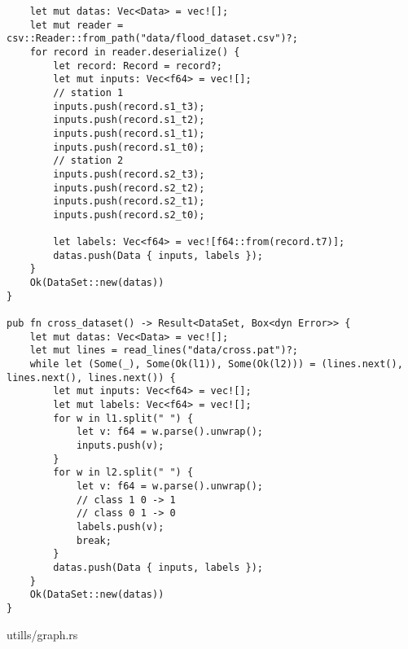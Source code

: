 \begin{verbatim}
    let mut datas: Vec<Data> = vec![];
    let mut reader = csv::Reader::from_path("data/flood_dataset.csv")?;
    for record in reader.deserialize() {
        let record: Record = record?;
        let mut inputs: Vec<f64> = vec![];
        // station 1
        inputs.push(record.s1_t3);
        inputs.push(record.s1_t2);
        inputs.push(record.s1_t1);
        inputs.push(record.s1_t0);
        // station 2
        inputs.push(record.s2_t3);
        inputs.push(record.s2_t2);
        inputs.push(record.s2_t1);
        inputs.push(record.s2_t0);

        let labels: Vec<f64> = vec![f64::from(record.t7)];
        datas.push(Data { inputs, labels });
    }
    Ok(DataSet::new(datas))
}

pub fn cross_dataset() -> Result<DataSet, Box<dyn Error>> {
    let mut datas: Vec<Data> = vec![];
    let mut lines = read_lines("data/cross.pat")?;
    while let (Some(_), Some(Ok(l1)), Some(Ok(l2))) = (lines.next(), lines.next(), lines.next()) {
        let mut inputs: Vec<f64> = vec![];
        let mut labels: Vec<f64> = vec![];
        for w in l1.split(" ") {
            let v: f64 = w.parse().unwrap();
            inputs.push(v);
        }
        for w in l2.split(" ") {
            let v: f64 = w.parse().unwrap();
            // class 1 0 -> 1
            // class 0 1 -> 0
            labels.push(v);
            break;
        }
        datas.push(Data { inputs, labels });
    }
    Ok(DataSet::new(datas))
}
\end{verbatim}
\noindent utills/graph.rs
